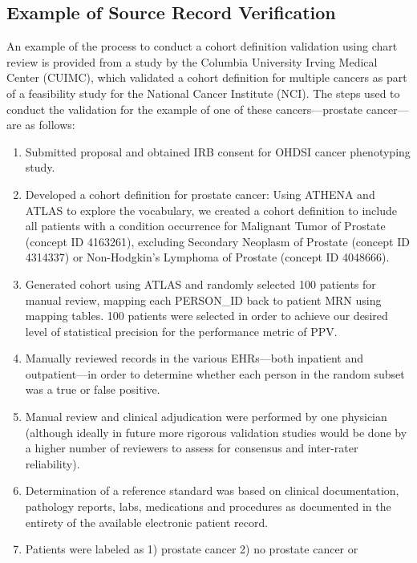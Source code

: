 \documentclass[11pt]{book}
\providecommand{\tightlist}{%
  \setlength{\itemsep}{0pt}\setlength{\parskip}{0pt}}
\theoremstyle{definition}
\theoremstyle{definition}
\theoremstyle{definition}
\theoremstyle{remark}
\begin{document}
\subsection{Example of Source Record
Verification}\label{example-of-source-record-verification}

An example of the process to conduct a cohort definition validation
using chart review is provided from a study by the Columbia University
Irving Medical Center (CUIMC), which validated a cohort definition for
multiple cancers as part of a feasibility study for the National Cancer
Institute (NCI). The steps used to conduct the validation for the
example of one of these cancers---prostate cancer---are as follows:

\begin{enumerate}
\def\labelenumi{\arabic{enumi}.}
\tightlist
\item
  Submitted proposal and obtained IRB consent for OHDSI cancer
  phenotyping study.
\item
  Developed a cohort definition for prostate cancer: Using ATHENA and
  ATLAS to explore the vocabulary, we created a cohort definition to
  include all patients with a condition occurrence for Malignant Tumor
  of Prostate (concept ID 4163261), excluding Secondary Neoplasm of
  Prostate (concept ID 4314337) or Non-Hodgkin's Lymphoma of Prostate
  (concept ID 4048666).
\item
  Generated cohort using ATLAS and randomly selected 100 patients for
  manual review, mapping each PERSON\_ID back to patient MRN using
  mapping tables. 100 patients were selected in order to achieve our
  desired level of statistical precision for the performance metric of
  PPV.
\item
  Manually reviewed records in the various EHRs---both inpatient and
  outpatient---in order to determine whether each person in the random
  subset was a true or false positive.
\item
  Manual review and clinical adjudication were performed by one
  physician (although ideally in future more rigorous validation studies
  would be done by a higher number of reviewers to assess for consensus
  and inter-rater reliability).
\item
  Determination of a reference standard was based on clinical
  documentation, pathology reports, labs, medications and procedures as
  documented in the entirety of the available electronic patient record.
\item
  Patients were labeled as 1) prostate cancer 2) no prostate cancer or

\end{enumerate}
\end{document}

